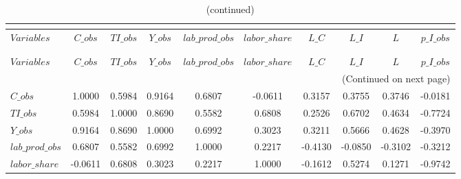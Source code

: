  
\begin{center}
\begin{longtable}{lccccccccc} 
\caption{MATRIX OF CORRELATIONS}\\
 \label{Table:th_corr_matrix}\\
\toprule 
$Variables       $	 & 	 $           C\_obs$	 & 	 $          TI\_obs$	 & 	 $           Y\_obs$	 & 	 $  lab\_prod\_obs$	 & 	 $     labor\_share$	 & 	 $             L\_C$	 & 	 $             L\_I$	 & 	 $                 L$	 & 	 $       p\_I\_obs$\\
\midrule \endfirsthead 
\caption{(continued)}\\
 \toprule \\ 
$Variables       $	 & 	 $           C\_obs$	 & 	 $          TI\_obs$	 & 	 $           Y\_obs$	 & 	 $  lab\_prod\_obs$	 & 	 $     labor\_share$	 & 	 $             L\_C$	 & 	 $             L\_I$	 & 	 $                 L$	 & 	 $       p\_I\_obs$\\
\midrule \endhead 
\midrule \multicolumn{10}{r}{(Continued on next page)} \\ \bottomrule \endfoot 
\bottomrule \endlastfoot 
$C\_obs          $	 & 	            1.0000	 & 	            0.5984	 & 	            0.9164	 & 	            0.6807	 & 	           -0.0611	 & 	            0.3157	 & 	            0.3755	 & 	            0.3746	 & 	           -0.0181 \\ 
$TI\_obs         $	 & 	            0.5984	 & 	            1.0000	 & 	            0.8690	 & 	            0.5582	 & 	            0.6808	 & 	            0.2526	 & 	            0.6702	 & 	            0.4634	 & 	           -0.7724 \\ 
$Y\_obs          $	 & 	            0.9164	 & 	            0.8690	 & 	            1.0000	 & 	            0.6992	 & 	            0.3023	 & 	            0.3211	 & 	            0.5666	 & 	            0.4628	 & 	           -0.3970 \\ 
$lab\_prod\_obs  $	 & 	            0.6807	 & 	            0.5582	 & 	            0.6992	 & 	            1.0000	 & 	            0.2217	 & 	           -0.4130	 & 	           -0.0850	 & 	           -0.3102	 & 	           -0.3212 \\ 
$labor\_share    $	 & 	           -0.0611	 & 	            0.6808	 & 	            0.3023	 & 	            0.2217	 & 	            1.0000	 & 	           -0.1612	 & 	            0.5274	 & 	            0.1271	 & 	           -0.9742 \\ 

\end{longtable}
\end{center}
